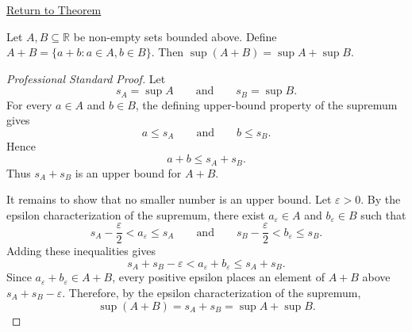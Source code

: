 \newpage
{}
\label{prf:supremum-sum-set}

\begin{remark*}[Return]
\hyperref[thm:supremum-sum-set]{Return to Theorem}
\end{remark*}

\begin{theorem*}
Let $A, B \subseteq \mathbb{R}$ be non-empty sets bounded above. Define $A + B = \{a + b : a \in A, b \in B\}$. Then $\sup(A + B) = \sup A + \sup B$.
\end{theorem*}

\begin{proof}[Professional Standard Proof]
\LRAProofBodyStart
Let
\[
s_A=\sup A
\qquad\text{and}\qquad
s_B=\sup B.
\]
For every $a\in A$ and $b\in B$, the defining upper-bound property of the
supremum gives
\[
a\le s_A
\qquad\text{and}\qquad
b\le s_B.
\]
Hence
\[
a+b\le s_A+s_B.
\]
Thus $s_A+s_B$ is an upper bound for $A+B$.

It remains to show that no smaller number is an upper bound. Let
$\varepsilon>0$. By the epsilon characterization of the supremum, there exist
$a_\varepsilon\in A$ and $b_\varepsilon\in B$ such that
\[
s_A-\frac{\varepsilon}{2}<a_\varepsilon\le s_A
\qquad\text{and}\qquad
s_B-\frac{\varepsilon}{2}<b_\varepsilon\le s_B.
\]
Adding these inequalities gives
\[
s_A+s_B-\varepsilon
<
a_\varepsilon+b_\varepsilon
\le
s_A+s_B.
\]
Since $a_\varepsilon+b_\varepsilon\in A+B$, every positive epsilon places an
element of $A+B$ above $s_A+s_B-\varepsilon$. Therefore, by the epsilon
characterization of the supremum,
\[
\sup(A+B)=s_A+s_B=\sup A+\sup B.
\]
\end{proof}

